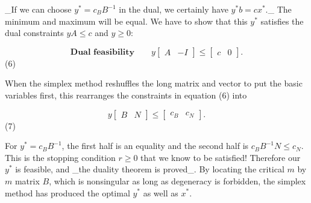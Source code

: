 _If we can choose \(y^{*}=c_{B}B^{-1}\) in the dual, we certainly have \(y^{*}b=cx^{*}\)._ The minimum and maximum will be equal. We have to show that this \(y^{*}\) satisfies the dual constraints \(yA\leq c\) and \(y\geq 0\):

\[\textbf{Dual feasibility}\qquad y\begin{bmatrix}A&-I\end{bmatrix}\leq \begin{bmatrix}c&0\end{bmatrix}.\] (6)

When the simplex method reshuffles the long matrix and vector to put the basic variables first, this rearranges the constraints in equation (6) into

\[y\begin{bmatrix}B&N\end{bmatrix}\leq\begin{bmatrix}c_{B}&c_{N}\end{bmatrix}.\] (7)

For \(y^{*}=c_{B}B^{-1}\), the first half is an equality and the second half is \(c_{B}B^{-1}N\leq c_{N}\). This is the stopping condition \(r\geq 0\) that we know to be satisfied! Therefore our \(y^{*}\) is feasible, and _the duality theorem is proved_. By locating the critical \(m\) by \(m\) matrix \(B\), which is nonsingular as long as degeneracy is forbidden, the simplex method has produced the optimal \(y^{*}\) as well as \(x^{*}\).

 